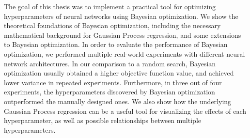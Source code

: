 \documentclass{article}
\begin{document}
The goal of this thesis was to implement a practical tool for optimizing
hyperparameters of neural networks using Bayesian optimization. We show the
theoretical foundations of Bayesian optimization, including the necessary
mathematical background for Gaussian Process regression, and some extensions to
Bayesian optimization. In order to evaluate the performance of Bayesian
optimization, we performed multiple real-world experiments with different
neural network architectures. In our comparison to a random search, Bayesian
optimization usually obtained a higher objective function value, and achieved
lower variance in repeated experiments. Furthermore, in three out of four
experiments, the hyperparameters discovered by Bayesian optimization
outperformed the manually designed ones. We also show how the underlying
Gaussian Process regression can be a useful tool for visualizing the effects of
each hyperparameter, as well as possible relationships between multiple
hyperparameters.
\end{document}
